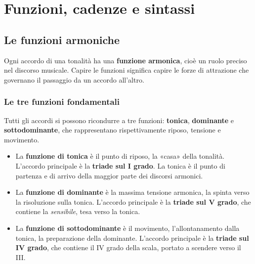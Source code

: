 \part{Funzioni, cadenze e sintassi}

\chapter{Le funzioni armoniche}
\label{chap:funzioni_armoniche}

Ogni accordo di una tonalità ha una \textbf{funzione armonica}, cioè un ruolo preciso nel discorso musicale. Capire le funzioni significa capire le forze di attrazione che governano il passaggio da un accordo all'altro.

\section{Le tre funzioni fondamentali}
\label{sec:tre_funzioni}

Tutti gli accordi si possono ricondurre a tre funzioni: \textbf{tonica}, \textbf{dominante} e \textbf{sottodominante}, che rappresentano rispettivamente riposo, tensione e movimento.

\begin{esempio}
\end{esempio}

\begin{definizione}
	\begin{itemize}
		\item \label{def:funzione_tonica}
		La \textbf{funzione di tonica} è il punto di riposo, la «casa» della tonalità. L'accordo principale è la \textbf{triade sul I grado}. La tonica è il punto di partenza e di arrivo della maggior parte dei discorsi armonici.
		\item \label{def:funzione_dominante}
		La \textbf{funzione di dominante} è la massima tensione armonica, la spinta verso la risoluzione sulla tonica. L'accordo principale è la \textbf{triade sul V grado}, che contiene la \textit{sensibile}, tesa verso la tonica.
		\item \label{def:funzione_sottodominante}
		La \textbf{funzione di sottodominante} è il movimento, l'allontanamento dalla tonica, la preparazione della dominante. L'accordo principale è la \textbf{triade sul IV grado}, che contiene il IV grado della scala, portato a scendere verso il III.
	\end{itemize}
\end{definizione}

